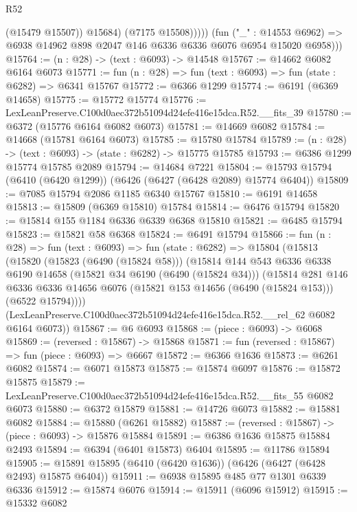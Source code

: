 \begin{lexlean}{R52}
\begin{coremodule}
                    (@15479 @15507))
                  @15684)
                (@7175 @15508)))))
        (fun ("_" : @14553 @6962) =>
        @6938 @14962 @898 @2047 @146 @6336 @6336 @6076 @6954 @15020 @6958)))
@15764 := (n : @28) -> (text : @6093) -> @14548
@15767 := @14662 @6082 @6164 @6073
@15771 := fun (n : @28) => fun (text : @6093) => fun (state : @6282) => @6341 @15767
@15772 := @6366 @1299
@15774 := @6191 (@6369 @14658)
@15775 := @15772 @15774
@15776 := LexLeanPreserve.C100d0aec372b51094d24efe416e15dca.R52.__fits_39
@15780 := @6372 (@15776 @6164 @6082 @6073)
@15781 := @14669 @6082
@15784 := @14668 (@15781 @6164 @6073)
@15785 := @15780 @15784
@15789 := (n : @28) -> (text : @6093) -> (state : @6282) -> @15775 @15785
@15793 := @6386 @1299 @15774 @15785 @2089
@15794 := @14684 @7221
@15804 := @15793 @15794 (@6410 (@6420 @1299)) (@6426 (@6427 (@6428 @2089) @15774 @6404))
@15809 := @7085 @15794 @2086 @1185 @6340 @15767
@15810 := @6191 @14658
@15813 := @15809 (@6369 @15810) @15784
@15814 := @6476 @15794
@15820 := @15814 @155 @1184 @6336 @6339 @6368 @15810
@15821 := @6485 @15794
@15823 := @15821 @58 @6368
@15824 := @6491 @15794
@15866 := fun (n : @28) =>
  fun (text : @6093) =>
  fun (state : @6282) =>
  @15804
    (@15813
      (@15820
        (@15823 (@6490 (@15824 @58)))
        (@15814
          @144
          @543
          @6336
          @6338
          @6190
          @14658
          (@15821 @34 @6190 (@6490 (@15824 @34)))
          (@15814
            @281
            @146
            @6336
            @6336
            @14656
            @6076
            (@15821 @153 @14656 (@6490 (@15824 @153)))
            (@6522 @15794))))
      (LexLeanPreserve.C100d0aec372b51094d24efe416e15dca.R52.__rel_62 @6082 @6164 @6073))
@15867 := @6 @6093
@15868 := (piece : @6093) -> @6068
@15869 := (reversed : @15867) -> @15868
@15871 := fun (reversed : @15867) => fun (piece : @6093) => @6667
@15872 := @6366 @1636
@15873 := @6261 @6082
@15874 := @6071 @15873
@15875 := @15874 @6097
@15876 := @15872 @15875
@15879 := LexLeanPreserve.C100d0aec372b51094d24efe416e15dca.R52.__fits_55 @6082 @6073
@15880 := @6372 @15879
@15881 := @14726 @6073
@15882 := @15881 @6082
@15884 := @15880 (@6261 @15882)
@15887 := (reversed : @15867) -> (piece : @6093) -> @15876 @15884
@15891 := @6386 @1636 @15875 @15884 @2493
@15894 := @6394 (@6401 @15873) @6404
@15895 := @11786 @15894
@15905 := @15891 @15895 (@6410 (@6420 @1636)) (@6426 (@6427 (@6428 @2493) @15875 @6404))
@15911 := @6938 @15895 @485 @77 @1301 @6339 @6336
@15912 := @15874 @6076
@15914 := @15911 (@6096 @15912)
@15915 := @15332 @6082

\end{coremodule}
\end{lexlean}
